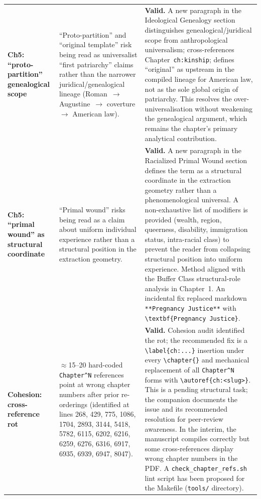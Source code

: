 \documentclass[12pt]{article}
\begin{document}
\begin{longtable}{@{}%
  >{\raggedright\arraybackslash}p{3.0cm}%
  >{\raggedright\arraybackslash}p{4.2cm}%
  >{\raggedright\arraybackslash}p{7.8cm}@{}}
\addlinespace

\textbf{Ch5: ``proto-partition'' genealogical scope}
&
``Proto-partition'' and ``original template'' risk being read as
universalist ``first patriarchy'' claims rather than the narrower
juridical/genealogical lineage (Roman~$\to$ Augustine~$\to$ coverture
$\to$ American law).
&
\textbf{Valid.}  A new paragraph in the Ideological Genealogy section
distinguishes genealogical/juridical scope from anthropological
universalism; cross-references Chapter~\texttt{ch:kinship}; defines
``original'' as upstream in the compiled lineage for American law, not
as the sole global origin of patriarchy.  This resolves the
over-universalisation without weakening the genealogical argument, which
remains the chapter's primary analytical contribution. \\

\addlinespace

\textbf{Ch5: ``primal wound'' as structural coordinate}
&
``Primal wound'' risks being read as a claim about uniform individual
experience rather than a structural position in the extraction geometry.
&
\textbf{Valid.}  A new paragraph in the Racialized Primal Wound section
defines the term as a structural coordinate in the extraction geometry
rather than a phenomenological universal.  A non-exhaustive list of
modifiers is provided (wealth, region, queerness, disability,
immigration status, intra-racial class) to prevent the reader from
collapsing structural position into uniform experience.  Method aligned
with the Buffer Class structural-role analysis in Chapter~1.
An incidental fix replaced markdown \texttt{**Pregnancy Justice**}
with \verb|\textbf{Pregnancy Justice}|. \\

\addlinespace

\textbf{Cohesion: cross-reference rot}
&
$\approx$15--20 hard-coded \texttt{Chapter\textasciicircum N} references
point at wrong chapter numbers after prior re-orderings (identified at
lines 268, 429, 775, 1086, 1704, 2893, 3144, 5418, 5782, 6115, 6202,
6216, 6259, 6276, 6316, 6917, 6935, 6939, 6947, 8047).
&
\textbf{Valid.}  Cohesion audit identified the rot; the recommended fix
is a \verb|\label{ch:...}| insertion under every \verb|\chapter{}| and
mechanical replacement of all \texttt{Chapter\textasciicircum N} forms
with \verb|\autoref{ch:<slug>}|.  This is a pending structural task;
the companion documents the issue and its recommended resolution for
peer-review awareness.  In the interim, the manuscript compiles
correctly but some cross-references display wrong chapter numbers in
the PDF.  A \texttt{check\_chapter\_refs.sh} lint script has been
proposed for the Makefile (\texttt{tools/} directory). \\

\end{longtable}
\end{document}
